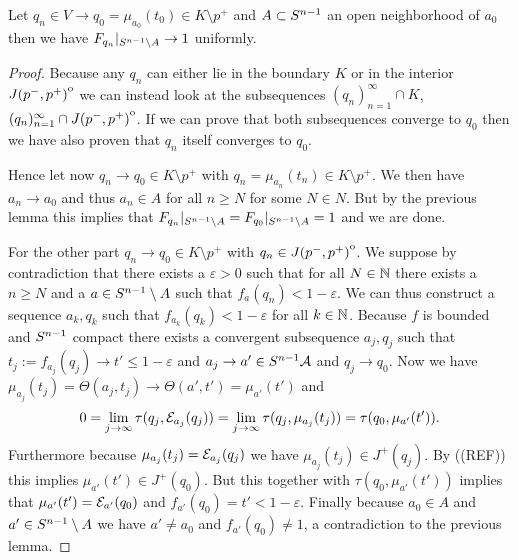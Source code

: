 \begin{lemma}\label{lem:convto1}
    Let $q_n\in V\to q_0=\mu_{a_0}(t_0)\in K\setminus{p^+}$ and $A\subset {S^{n-1}}$ an open neighborhood of $a_0$ then we have $F_{q_n}\rvert_{{S^{n-1}}\setminus A} \to 1$ uniformly.
\end{lemma}
\begin{proof}
    Because any $q_n$ can either lie in the boundary $K$ or in the interior ${\kern0ptJ(p^-,p^+)}^{\mathrm{o}}$ we can instead look at the subsequences $(q_n)_{n=1}^\infty \cap K$, $(q_n)_{n=1}^\infty \cap {\kern0ptJ(p^-,p^+)}^{\mathrm{o}}$. If we can prove that both subsequences converge to $q_0$ then we have also proven that $q_n$ itself converges to $q_0$. 

    Hence let now $q_n \to q_0\in K\setminus p^+$ with $q_n=\mu_{a_n}(t_n) \in K\setminus p^+$. We then have $a_n\to a_0$ and thus $a_n \in A$ for all $n\ge N$ for some $N\in N$. But by the previous lemma this implies that $F_{q_n}\rvert_{{S^{n-1}}\setminus A} = F_{q_0}\rvert_{{S^{n-1}}\setminus A} = 1$ and we are done.

    For the other part $q_n \to q_0\in K\setminus p^+$ with $q_n \in {\kern0ptJ(p^-,p^+)}^{\mathrm{o}}$.
    We suppose by contradiction that there exists a $\varepsilon>0$ such that for all $N\in \mathbb{N}$ there exists a $n\ge N$ and a $a\in {S^{n-1}}\setminus A$ such that $f_a(q_n)<1-\varepsilon$. We can thus construct a sequence $a_k, q_k$ such that $f_{a_k}(q_k)<1-\varepsilon$ for all $k\in \mathbb{N}$. Because $f$ is bounded and ${S^{n-1}}$ compact there exists a convergent subsequence $a_j,q_j$ such that $t_j:=f_{a_j}(q_j)\to t'\leq 1-\varepsilon$ and $a_j \to a'\in {S^{n-1}}\mathcal{A}$ and $q_j\to q_0$. Now we have $\mu_{a_j}(t_j) = \Theta(a_j,t_j) \to \Theta(a',t')=\mu_{a'}(t')$ and 
    \[
        0 = \lim_{j\to \infty}\tau(q_j,{\mathcal{E}}_{a_j}(q_j)) = \lim_{j\to \infty}\tau(q_j,\mu_{a_j}(t_j)) = \tau(q_0,\mu_{a'}(t')).
    \]
    Furthermore because $\mu_{a_j}(t_j)={\mathcal{E}}_{a_j}(q_j)$ we have $\mu_{a_j}(t_j)\in J^+(q_j)$. By ((REF)) this implies $\mu_{a'}(t')\in J^+(q_0)$. But this together with $\tau(q_0,\mu_{a'}(t'))$ implies that $\mu_{a'}(t')={\mathcal{E}}_{a'}(q_0)$ and $f_{a'}(q_0)=t'<1-\varepsilon$. Finally because $a_0\in A$ and $a'\in {S^{n-1}}\setminus A$ we have $a'\neq a_0$ and $f_{a'}(q_0)\neq 1$, a contradiction to the previous lemma.
\end{proof}


